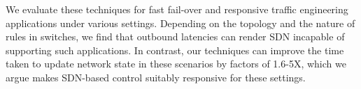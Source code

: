  We evaluate these techniques for fast fail-over and responsive
 traffic engineering applications under various settings. Depending on
 the topology and the nature of rules in switches, we find that
outbound latencies can render SDN incapable of supporting such
applications. In contrast, 
our techniques can
 improve the time taken to update network state in these scenarios by factors
 of 1.6-5X, which we argue makes SDN-based control suitably responsive for these
 settings.
\fi








 

